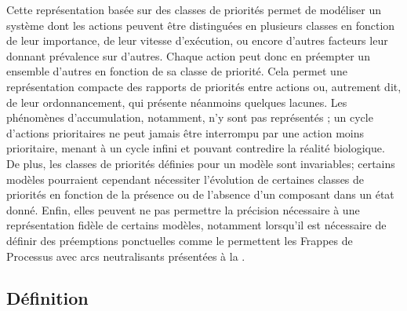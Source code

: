 Cette représentation basée sur des classes de priorités permet de modéliser un système
dont les actions peuvent être distinguées en plusieurs classes en fonction de leur importance,
de leur vitesse d'exécution, ou encore d'autres facteurs leur donnant prévalence sur d'autres.
Chaque action peut donc en préempter un ensemble d'autres en fonction de sa classe de priorité.
Cela permet une représentation compacte des rapports de priorités entre actions
ou, autrement dit, de leur ordonnancement,
qui présente néanmoins quelques lacunes.
Les phénomènes d'accumulation, notamment, n'y sont pas représentés ;
un cycle d'actions prioritaires ne peut jamais être interrompu par une action moins prioritaire,
menant à un cycle infini et pouvant contredire la réalité biologique.
De plus, les classes de priorités définies pour un modèle sont invariables;
certains modèles pourraient cependant nécessiter l'évolution de certaines classes de priorités
en fonction de la présence ou de l'absence d'un composant dans un état donné.
Enfin, elles peuvent ne pas permettre la précision nécessaire à une représentation fidèle de
certains modèles, notamment lorsqu'il est nécessaire de définir des préemptions ponctuelles
comme le permettent les Frappes de Processus avec arcs neutralisants
présentées à la .



\subsection{Définition}

